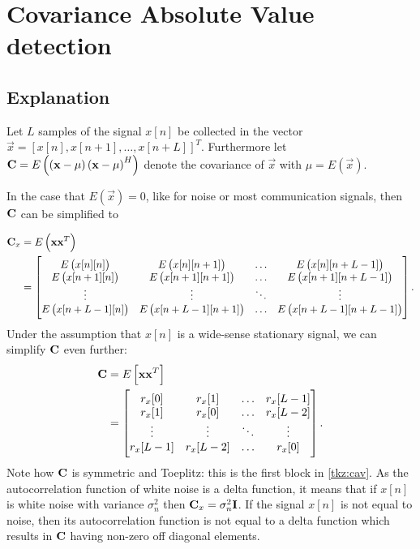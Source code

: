 \documentclass[a4paper, openany, oneside]{memoir}
\begin{document}
\section{Covariance Absolute Value detection}\label{sec:cav_derivation}

\subsection{Explanation}
Let $L$ samples of the signal $x[n]$ be collected in the vector $\vec{x} = \left[x[n], x[n+1], \ldots, x[n+L]\right]^T$. 
Furthermore let $\boldsymbol{\mathbf{C}} = E\left(\left(\boldsymbol{\mathbf{x}} - \mu \right)\left(\boldsymbol{\mathbf{x}} - \mu \right)^H\right)$ denote the covariance of $\vec{x}$ with $\mu = E(\vec{x})$.

In the case that $E\left(\vec{x}\right)=0$, like for noise or most communication signals, then $\boldsymbol{\mathbf{C}}$ can be simplified to

\begin{align*}
\boldsymbol{\mathbf{C}}_x &= E\left(\boldsymbol{\mathbf{x}}\boldsymbol{\mathbf{x}}^T\right) \\
&= \begin{bmatrix} 
E\left(x[n][n]\right) & E\left(x[n][n+1]\right) & \ldots & E\left(x[n][n+L-1]\right) \\
E\left(x[n+1][n]\right) & E\left(x[n+1][n+1]\right) & \ldots & E\left(x[n+1][n+L-1]\right) \\
\vdots & \vdots & \ddots & \vdots \\
E\left(x[n+L-1][n]\right) & E\left(x[n+L-1][n+1]\right) & \ldots & E\left(x[n+L-1][n+L-1]\right) \\
\end{bmatrix}.
\end{align*}
Under the assumption that $x[n]$ is a wide-sense stationary signal, we can simplify $\boldsymbol{\mathbf{C}}$ even further:
\begin{align*}
\boldsymbol{\mathbf{C}}&= E\left[\boldsymbol{\mathbf{x}}\boldsymbol{\mathbf{x}}^T\right] \\
&= \begin{bmatrix} 
r_x[0] & r_x[1] & \ldots & r_x[L-1] \\
r_x[1] & r_x[0] & \ldots & r_x[L-2] \\
\vdots & \vdots & \ddots & \vdots \\
r_x[L-1] & r_x[L-2] & \ldots & r_x[0] \\
\end{bmatrix}.
\end{align*}
Note how $\boldsymbol{\mathbf{C}}$ is symmetric and Toeplitz: this is the first block in \cref{tkz:cav}. As  the autocorrelation function of white noise is a delta function, it means that  if $x[n]$ is white noise with variance $\sigma_n^2$ then $\boldsymbol{\mathbf{C}}_x = \sigma_n^2\boldsymbol{\mathbf{I}}$.
If the signal $x[n]$ is not equal to noise, then its autocorrelation function is not equal to a delta function which results in $\boldsymbol{\mathbf{C}}$ having non-zero off diagonal elements.
\end{document}
